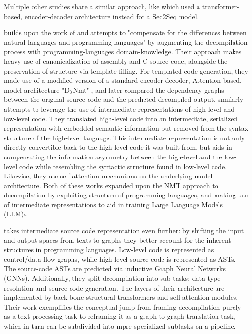 \documentclass[../main.tex]{subfiles}
\begin{document}
Multiple other studies share a similar approach, like \cite{hosseini_beyond_2022} 
which used a transformer-based, encoder-decoder architecture instead for a Seq2Seq
model.

\cite{katz_towards_2019} builds upon the work of \cite{katz_using_2018} and attempts 
to "compensate for the differences between natural languages and programming 
languages" by augmenting the decompilation process with programming-languages 
domain-knowledge. Their approach makes heavy use of canonicalization of assembly 
and C-source code, alongside the preservation of structure via template-filling. 
For templated-code generation, they made use of a modified version of a standard 
encoder-decoder, Attention-based, model architecture "DyNmt" \cite{dynmt}, and 
later compared the dependency graphs between the original source code and the 
predicted decompiled output.
\cite{liang_semantics-recovering_2021} similarly attempts to leverage the use of
intermediate representations of high-level and low-level code. They translated 
high-level code into an intermediate, serialized representation with embedded 
semantic information but removed from the syntax structure of the high-level 
language. This intermediate representation is not only directly convertible back
to the high-level code it was built from, but aids in compensating the information
asymmetry between the high-level and the low-level code while resembling the 
syntactic structure found in low-level code. Likewise, they use self-attention 
mechanisms on the underlying model architecture.
Both of these works expanded upon the NMT approach to decompilation by exploiting
structure of programming languages, and making use of intermediate representations
to aid in training Large Language Models (LLM)s.

\cite{fu_n-bref_2020} takes intermediate source code representation even further: 
by shifting the input and output spaces from texts to graphs they better account 
for the inherent structures in programming languages. Low-level code is represented 
as control/data flow graphs, while high-level source code is represented as ASTs.
The source-code ASTs are predicted via inductive Graph Neural Networks (GNNs).
Additionally, they split decompilation into sub-tasks: data-type resolution and 
source-code generation. The layers of their architecture are implemented by back-bone
structural transformers and self-attention modules.
Their work exemplifies the conceptual jump from framing decompilation purely as a
text-processing task to reframing it as a graph-to-graph translation task, which
in turn can be subdivided into mpre specialized subtasks on a pipeline.
\end{document}

